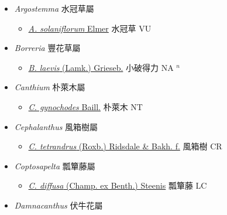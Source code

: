 
  \begin{itemize}
 \item[] \textit{Argostemma} 水冠草屬
                    
  \begin{itemize}
        \item[] \href{http://www.theplantlist.org/tpl1.1/search?q=Argostemma+solaniflorum}{\textit{A. solaniflorum} Elmer}   水冠草 VU
  \end{itemize}
 \item[] \textit{Borreria} 豐花草屬
                    
  \begin{itemize}
        \item[] \href{http://www.theplantlist.org/tpl1.1/search?q=Borreria+laevis}{\textit{B. laevis} (Lamk.) Grieseb.}   小破得力 NA $^n$
  \end{itemize}
 \item[] \textit{Canthium} 朴萊木屬
                    
  \begin{itemize}
        \item[] \href{http://www.theplantlist.org/tpl1.1/search?q=Canthium+gynochodes}{\textit{C. gynochodes} Baill.}   朴萊木 NT
  \end{itemize}
 \item[] \textit{Cephalanthus} 風箱樹屬
                    
  \begin{itemize}
        \item[] \href{http://www.theplantlist.org/tpl1.1/search?q=Cephalanthus+tetrandrus}{\textit{C. tetrandrus} (Roxb.) Ridsdale \& Bakh. f.}   風箱樹 CR
  \end{itemize}
 \item[] \textit{Coptosapelta} 瓢簞藤屬
                    
  \begin{itemize}
        \item[] \href{http://www.theplantlist.org/tpl1.1/search?q=Coptosapelta+diffusa}{\textit{C. diffusa} (Champ. ex Benth.) Steenis}   瓢簞藤 LC
  \end{itemize}
 \item[] \textit{Damnacanthus} 伏牛花屬
                    

\end{itemize}
